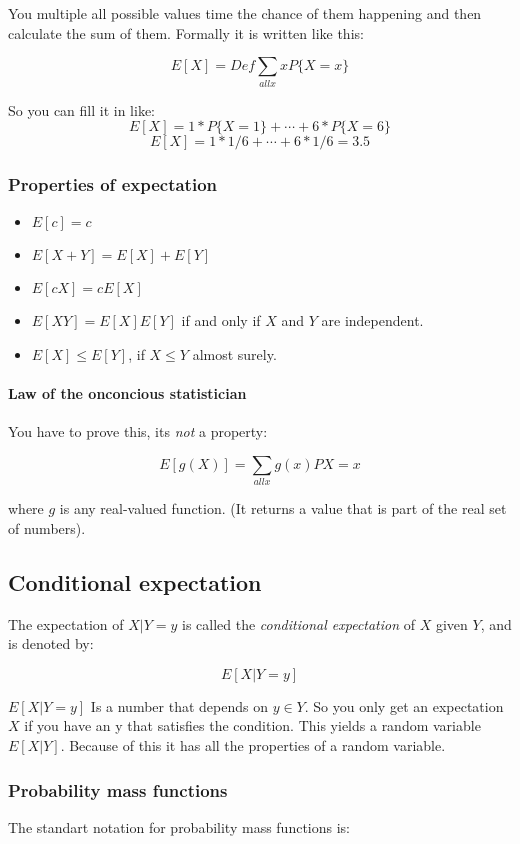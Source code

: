 \documentclass{article}
\begin{document}
You multiple all possible values time the chance of them happening and then
calculate the sum of them. Formally it is written like this:

\[ E[X]=Def \sum_{all x} xP\{X=x\} \]

So you can fill it in like:
\[E[X]= 1 * P\{X=1\} + \cdots + 6 *P\{X=6\}\]
\[E[X]= 1 * 1/6 + \cdots + 6 *1/6 = 3.5\]

\subsubsection{Properties of expectation}

\begin{itemize}
	\item $E[c] = c$
	\item $E[X+Y] = E[X] + E[Y]$
	\item $E[cX] = cE[X]$
	\item $E[XY] = E[X]E[Y]$ if and only if $X$ and $Y$ are independent.
	\item $E[X] \le E[Y]$, if $X \le Y$ almost surely.
\end{itemize}

\paragraph{Law of the onconcious statistician}
You have to prove this, its \emph{not} a property:

\[E[g(X)]=\sum_{all x} g(x)P{X=x}\]

where $g$ is any real-valued function. (It returns a value that is part
of the real set of numbers).

\subsection{Conditional expectation}
The expectation of $X | Y = y$ is called the \emph{conditional expectation}
of $X$ given $Y$, and is denoted by:

\[E[X|Y=y]\]

$E[X|Y=y]$ Is a number that depends on $y \in Y$. So you only get an
expectation $X$ if you have an y that satisfies the condition.
This yields a random variable $E[X|Y]$. Because of this it has all the
properties of a random variable.

\subsubsection{Probability mass functions}
The standart notation for probability mass functions is:
\end{document}
